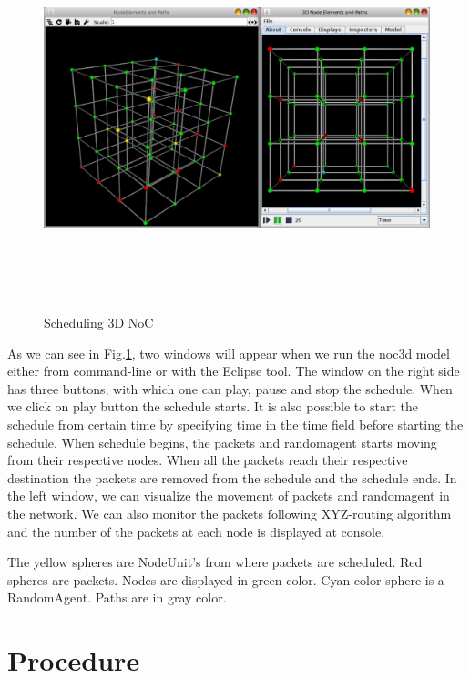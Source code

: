 \vspace{15 mm}
\begin{figure}[H] 
\flushleft
\includegraphics[height=4.4in, width=5.8in]{noc3d.eps}
\caption{Scheduling 3D NoC}
\label{fig:6.4}
\vspace{10mm}
\end{figure} 


As we can see in Fig.\ref{fig:6.4}, two windows will appear when we run the noc3d model either from command-line or with the Eclipse tool. The window on the right side has three buttons, with which one can play, pause and stop the schedule. When we click on play button the schedule starts. It is also possible to start the schedule from certain time by specifying time in the time field before starting the schedule. When schedule begins, the packets and randomagent starts moving from their respective nodes. When all the packets reach their respective destination the packets are removed from the schedule and the schedule ends. In the left window, we can visualize the movement of packets and randomagent in the network. We can also monitor the packets following XYZ-routing algorithm and the number of the packets at each node is displayed at console.  

The yellow spheres are NodeUnit's from where packets are scheduled. Red spheres are packets. Nodes are displayed in green color. Cyan color sphere is a RandomAgent. Paths are in gray color. 
 
\section{Procedure}
\vspace{5mm}


